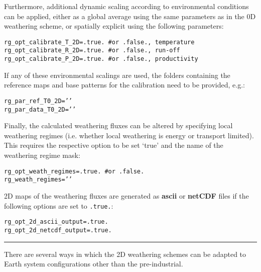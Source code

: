 Furthermore, additional dynamic scaling according to environmental conditions can be applied, either as a global average using the same parameters as in the 0D weathering scheme, or spatially explicit using the following parameters:
\vspace{-1mm}\small\begin{verbatim}
rg_opt_calibrate_T_2D=.true. #or .false., temperature
rg_opt_calibrate_R_2D=.true. #or .false., run-off
rg_opt_calibrate_P_2D=.true. #or .false., productivity
\end{verbatim}\normalsize\vspace{-1mm}

If any of these environmental scalings are used, the folders containing the reference maps and base patterns for the calibration need to be provided, e.g.:
\vspace{-1mm}\small\begin{verbatim}
rg_par_ref_T0_2D=’’
rg_par_data_T0_2D=’’
\end{verbatim}\normalsize\vspace{-1mm}

Finally, the calculated weathering fluxes can be altered by specifying local weathering regimes (i.e. whether local weathering is energy or transport limited). This requires the respective option to be set ‘true’ and the name of the weathering regime mask:
\vspace{-1mm}\small\begin{verbatim}
rg_opt_weath_regimes=.true. #or .false.
rg_weath_regimes=’’
\end{verbatim}\normalsize\vspace{-1mm}

2D maps of the weathering fluxes are generated as \textbf{ascii} or \textbf{netCDF} files if the following options are set to \texttt{.true.}:
\vspace{-1mm}\small\begin{verbatim}
rg_opt_2d_ascii_output=.true.
rg_opt_2d_netcdf_output=.true.
\end{verbatim}\normalsize\vspace{-1mm}

\vspace{1mm}
\noindent\rule{4cm}{0.5pt}
\vspace{2mm}

\noindent There are several ways in which the 2D weathering schemes can be adapted to Earth system configurations other than the pre-industrial.

